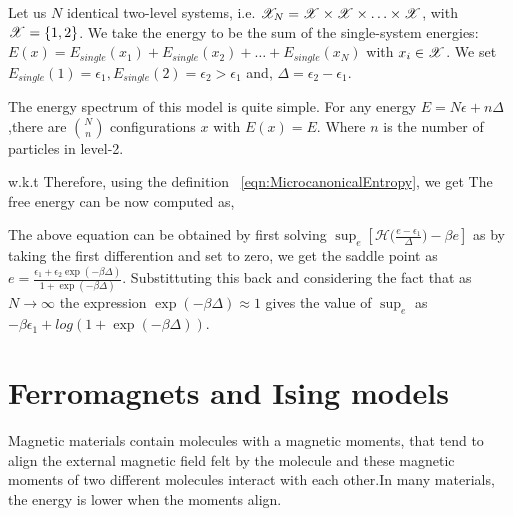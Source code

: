 \documentclass[letterpaper,english,10pt]{article}
\begin{document}
\begin{shaded*} 
\begin{exmp}
Let us $N$ identical two-level systems, i.e. $\mathscr{X} _N = \mathscr{X} \times \mathscr{X}  \times \ldots \times \mathscr{X}$, with $\mathscr{X} = \{1,2\}$. We take the energy to be the sum of the single-system energies: $E(x) = E_{single}(x_1) + E_{single}(x_2) + \ldots + E_{single}(x_N) $ with $x_i \in \mathscr{X}$. We set $E_{single}(1) = \epsilon_1, E_{single}(2) = \epsilon_2 > \epsilon_1$ and, $\Delta = \epsilon_2 - \epsilon_1$.

The energy spectrum of this model is quite simple. For any energy $E = N \epsilon + n\Delta$,there are $\binom{N}{n}$ configurations $x$ with $E(x) = E$. 
Where $n$ is the number of particles in level-2.

w.k.t 
Therefore, using the definition ~\eqref{eqn:MicrocanonicalEntropy}, we get
The free energy can be now computed as,

The above equation can be obtained by first solving $ \sup_e [\mathcal{H}\Big(\frac{e-\epsilon_1}{\Delta}\Big) -\beta e]$ as by taking the first differention and set to zero, we get the saddle point as $ e=\frac{\epsilon_1 + \epsilon_2 \exp(-\beta \Delta)}{1+\exp(-\beta \Delta)}$. Substittuting this back and considering the fact that as $N \to \infty$ the expression $\exp(-\beta \Delta) \approx 1$ gives the value of $\sup_e$ as $-\beta\epsilon_1+log (1+\exp(-\beta \Delta))$.
\end{exmp}
\end{shaded*}


\section{Ferromagnets and Ising models}
Magnetic materials contain molecules with a magnetic moments, that tend to align the external magnetic field felt by the molecule and these magnetic moments of two different molecules interact with each other.In many materials, the energy is lower when the moments align. 
\end{document}
